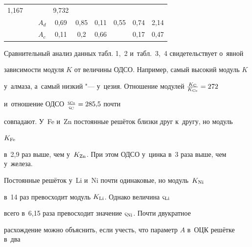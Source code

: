 \begin{table}[t!]
\begin{minipage}{.88\textwidth}
\begin{tabular}{p{3cm}|c|c|c|c|c|c}
1,167& 

9,732 \\


~~~~~~~~~$A_d$& 

0,69& 

0,85& 

0,11& 

0,55& 

0,74& 

2,14 \\


~~~~~~~~~$A_c$& 

0,11& 

0,2& 

0,66& 

& 

0,17& 

0,47 \\

\hline

\end{tabular} 

\end{minipage}

\end{table}



Сравнительный анализ данных табл. 1,~2 и~табл.~3,~4 свидетельствует о~явной 

зависимости модуля $K$ от величины ОДСО. Например, самый высокий модуль $K$ 

у~алмаза, а~самый низкий "--- у~цезия. Отношение модулей $\frac{K_{\rm C}}{K_{\rm Cs}} = 272$ 

и~отношение ОДСО $\frac{\varsigma_{\rm Cs}}{\varsigma _{\rm C}} = 285{,}5$ почти 

совпадают. У~Fe и~Zn постоянные решёток близки друг к~другу, но модуль 

$K_{\rm Fe}$

в~2,9 раз выше, чем у~$K_{\rm Zn}$. При этом ОДСО у~цинка в~3 раза выше, чем у~железа. 

Постоянные решёток у~Li и~Ni почти одинаковые, но модуль~$K_{\rm Ni}$ 

в~14 раз превосходит модуль $K_{\rm Li}$. Однако величина $\varsigma _{\rm Li}$ 

всего в~6{,}15 раза превосходит значение $\varsigma _{\rm Ni}$. Почти двукратное 

расхождение можно объяснить, если учесть, что параметр $A$ в~ОЦК решётке в~два 

